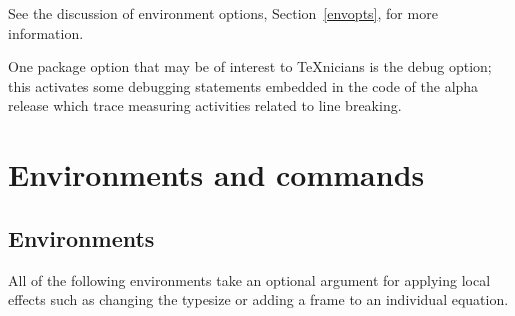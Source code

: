 \documentclass{article}
\def\tex/{{\protect\TeX}}
\newcommand{\ntt}{\normalfont\ttfamily}
\DeclareRobustCommand{\pkg}[1]{{\ntt#1}}
\let\opt=\pkg \let\env=\pkg \let\fn=\pkg
\begin{document}
See the discussion of environment options, Section~\ref{envopts}, for
more information.

One package option that may be of interest to \tex/nicians is the
\opt{debug} option; this activates some debugging statements embedded in
the code of the alpha release which trace measuring activities related
to line breaking.

\section{Environments and commands}
\subsection{Environments}
All of the following environments take an optional argument for
applying local effects such as changing the typesize or adding a
frame to an individual equation.
\end{document}
